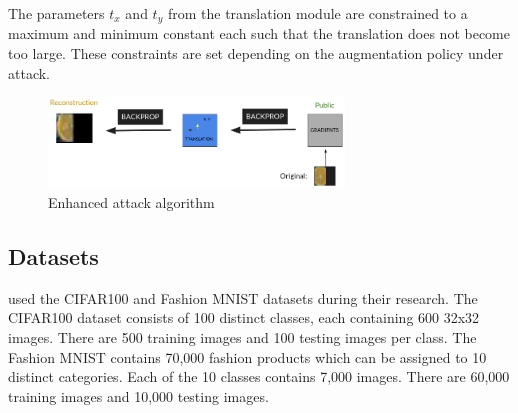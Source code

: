 The parameters $t_x$ and $t_y$ from the translation module are constrained to a maximum and minimum constant each such that the translation does not become too large. These constraints are set depending on the augmentation policy under attack.

\begin{figure}
    \centering
    \includegraphics[width = 0.7\textwidth]{enhfig2.png}
    \caption{Enhanced attack algorithm}
    \label{fig:enhfg}
\end{figure}


\subsection{Datasets}
\citeauthor{gao2021privacy} used the CIFAR100 \cite{unknown-author-2009} and Fashion MNIST \cite{xiao2017fashionmnist} datasets during their research. The CIFAR100 dataset consists of 100 distinct classes, each containing 600 32x32 images. There are 500 training images and 100 testing images per class. The Fashion MNIST contains 70,000 fashion products which can be assigned to 10 distinct categories. Each of the 10 classes contains 7,000 images. There are 60,000 training images and 10,000 testing images.


